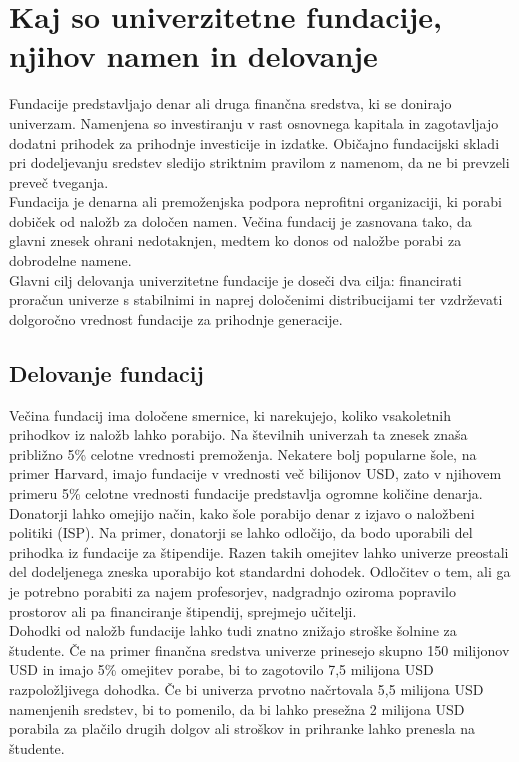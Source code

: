 \documentclass[12pt, a4paper]{article}
\begin{document}
\section{Kaj so univerzitetne fundacije, njihov namen in delovanje}


Fundacije predstavljajo denar ali druga finančna sredstva, ki se donirajo univerzam. Namenjena so investiranju v rast osnovnega kapitala in zagotavljajo dodatni prihodek za prihodnje investicije in izdatke. Običajno fundacijski skladi pri dodeljevanju sredstev sledijo striktnim pravilom z namenom, da ne bi prevzeli preveč tveganja. \\

Fundacija je denarna ali premoženjska podpora neprofitni organizaciji, ki porabi dobiček od naložb za določen namen. Večina fundacij je zasnovana tako, da glavni znesek ohrani nedotaknjen, medtem ko donos od naložbe porabi za dobrodelne namene. \\

Glavni cilj delovanja univerzitetne fundacije je doseči dva cilja: financirati proračun univerze s stabilnimi in naprej določenimi distribucijami ter vzdrževati dolgoročno vrednost fundacije za prihodnje generacije. \cite{harvard-porocilo}

\subsection{Delovanje fundacij}

Večina fundacij ima določene smernice, ki narekujejo, koliko vsakoletnih prihodkov iz naložb lahko porabijo. Na številnih univerzah ta znesek znaša približno 5\% celotne vrednosti premoženja. Nekatere bolj popularne šole, na primer Harvard, imajo fundacije v vrednosti več bilijonov USD, zato v njihovem primeru 5\% celotne vrednosti fundacije predstavlja ogromne količine denarja. \cite{Investopedia}\\

Donatorji lahko omejijo način, kako šole porabijo denar z izjavo o naložbeni politiki (ISP). Na primer, donatorji se lahko odločijo, da bodo uporabili del prihodka iz fundacije za štipendije. Razen takih omejitev lahko univerze preostali del dodeljenega zneska uporabijo kot standardni dohodek. Odločitev o tem, ali ga je potrebno porabiti za najem profesorjev, nadgradnjo oziroma popravilo prostorov ali pa financiranje štipendij, sprejmejo učitelji. \\

Dohodki od naložb fundacije lahko tudi znatno znižajo stroške šolnine za študente. Če na primer finančna sredstva univerze prinesejo skupno 150 milijonov USD in imajo 5\% omejitev porabe, bi to zagotovilo 7,5 milijona USD razpoložljivega dohodka. Če bi univerza prvotno načrtovala 5,5 milijona USD namenjenih sredstev, bi to pomenilo, da bi lahko presežna 2 milijona USD porabila za plačilo drugih dolgov ali stroškov in prihranke lahko prenesla na študente. \cite{Investopedia}\\
\end{document}
